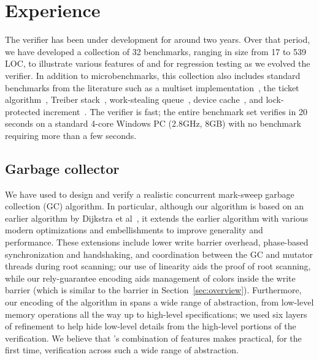 \section{Experience}
\label{sec:experience}

The \civl verifier has been under development for around two years.  
Over that period, we have developed a collection of 32 benchmarks, 
ranging in size from 17 to 539 LOC, to illustrate various features of
\civl and for regression testing as we evolved the verifier.
In addition to microbenchmarks, this collection also includes
standard benchmarks from the literature such as a multiset implementation~\cite{ElmasTQ05}, 
the ticket algorithm~\cite{FarzanKP14}, 
Treiber stack~\cite{Herlihy2008}, work-stealing queue~\cite{Blumofe1999},
device cache~\cite{ElmasQT09}, and lock-protected increment~\cite{FlanaganQ03}. 
The \civl verifier is fast; the entire benchmark set verifies in 20 seconds on a standard 4-core Windows PC (2.8GHz, 8GB)
with no benchmark requiring more than a few seconds.

\subsection{Garbage collector}
We have used \civl to design and verify a realistic concurrent mark-sweep garbage collection (GC) algorithm.  
In particular, although our algorithm is based on an earlier algorithm by Dijkstra et al~\cite{dijk78}, 
it extends the earlier algorithm with various modern optimizations and embellishments to improve generality and performance.  
These extensions include lower write barrier overhead, phase-based synchronization and handshaking, 
and coordination between the GC and mutator threads during root scanning; our use of linearity aids the proof of root scanning, 
while our rely-guarantee encoding aids management of colors inside the write barrier
(which is similar to the barrier in Section~\ref{sec:overview}).
Furthermore, our encoding of the algorithm in \civl spans a wide range of abstraction, 
from low-level memory operations all the way up to high-level specifications; 
we used six layers of refinement to help hide low-level details from the high-level portions of the verification.
We believe that \civl's combination of features makes practical, for the first time, verification across such a wide range of abstraction.

